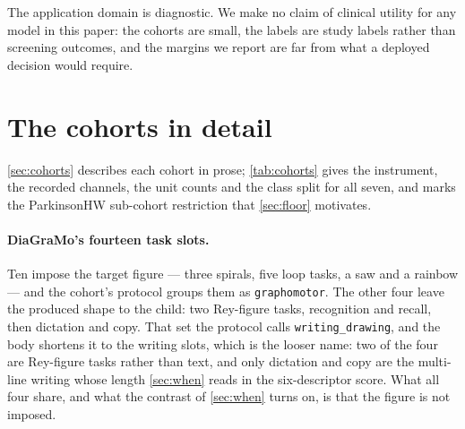 \documentclass{article}
\newif\ifidentified
\begin{document}
The application domain is diagnostic. We make no claim of clinical utility for any model in this
paper: the cohorts are small, the labels are study labels rather than screening outcomes, and the
margins we report are far from what a deployed decision would require.

\ifidentified
\section*{Acknowledgements}

This study was financed in part by the Coordena\c{c}\~ao de Aperfei\c{c}oamento de Pessoal
de N\'ivel Superior --- Brasil (CAPES) --- Finance Code 001, and by a CAPES PDSE
scholarship (process 88881.266133/2026-01). \'A.~S\'anchez acknowledges the support from
Spanish State Research Agency project no.\ PID2025-169751OB-I00.
\fi




\appendix

\section{The cohorts in detail}
\label{sec:cohorts-appendix}

\cref{sec:cohorts} describes each cohort in prose; \cref{tab:cohorts} gives the instrument, the
recorded channels, the unit counts and the class split for all seven, and marks the ParkinsonHW
sub-cohort restriction that \cref{sec:floor} motivates.



\paragraph{DiaGraMo's fourteen task slots.} Ten impose the target figure --- three spirals, five
loop tasks, a saw and a rainbow --- and the cohort's protocol groups them as \texttt{graphomotor}.
The other four leave the produced shape to the child: two Rey-figure tasks, recognition and recall,
then dictation and copy. That set the protocol calls \texttt{writing\_drawing}, and the body
shortens it to the writing slots, which is the looser name: two of the four are Rey-figure tasks
rather than text, and only dictation and copy are the multi-line writing whose length
\cref{sec:when} reads in the six-descriptor score. What all four share, and what the contrast of
\cref{sec:when} turns on, is that the figure is not imposed.
\end{document}
